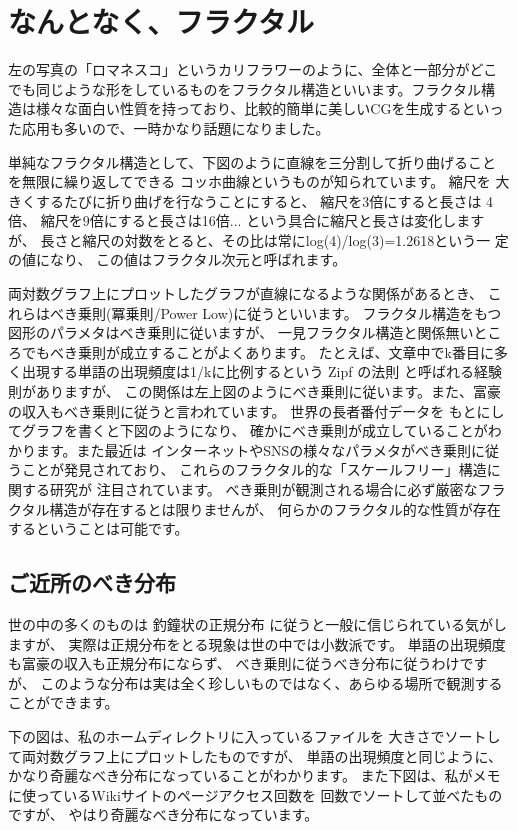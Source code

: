 \section{なんとなく、フラクタル}

左の写真の「ロマネスコ」というカリフラワーのように、全体と一部分がどこ
でも同じような形をしているものをフラクタル構造といいます。フラクタル構
造は様々な面白い性質を持っており、比較的簡単に美しいCGを生成するといっ
た応用も多いので、一時かなり話題になりました。

単純なフラクタル構造として、下図のように直線を三分割して折り曲げること
を無限に繰り返してできる コッホ曲線というものが知られています。 縮尺を
大きくするたびに折り曲げを行なうことにすると、 縮尺を3倍にすると長さは
4倍、 縮尺を9倍にすると長さは16倍... という具合に縮尺と長さは変化します
が、 長さと縮尺の対数をとると、その比は常にlog(4)/log(3)=1.2618という一
定の値になり、 この値はフラクタル次元と呼ばれます。

両対数グラフ上にプロットしたグラフが直線になるような関係があるとき、 これらはべき乗則(冪乗則/Power Low)に従うといいます。 フラクタル構造をもつ図形のパラメタはべき乗則に従いますが、 一見フラクタル構造と関係無いところでもべき乗則が成立することがよくあります。 たとえば、文章中でk番目に多く出現する単語の出現頻度は1/kに比例するという Zipf の法則 と呼ばれる経験則がありますが、 この関係は左上図のようにべき乗則に従います。また、富豪の収入もべき乗則に従うと言われています。 世界の長者番付データを もとにしてグラフを書くと下図のようになり、 確かにべき乗則が成立していることがわかります。また最近は インターネットやSNSの様々なパラメタがべき乗則に従うことが発見されており、 これらのフラクタル的な「スケールフリー」構造に関する研究が 注目されています。 べき乗則が観測される場合に必ず厳密なフラクタル構造が存在するとは限りませんが、 何らかのフラクタル的な性質が存在するということは可能です。

\subsection{ご近所のべき分布}

世の中の多くのものは 釣鐘状の正規分布 に従うと一般に信じられている気がしますが、 実際は正規分布をとる現象は世の中では小数派です。 単語の出現頻度も富豪の収入も正規分布にならず、 べき乗則に従うべき分布に従うわけですが、 このような分布は実は全く珍しいものではなく、あらゆる場所で観測することができます。

下の図は、私のホームディレクトリに入っているファイルを 大きさでソートして両対数グラフ上にプロットしたものですが、 単語の出現頻度と同じように、かなり奇麗なべき分布になっていることがわかります。
また下図は、私がメモに使っているWikiサイトのページアクセス回数を 回数でソートして並べたものですが、 やはり奇麗なべき分布になっています。

